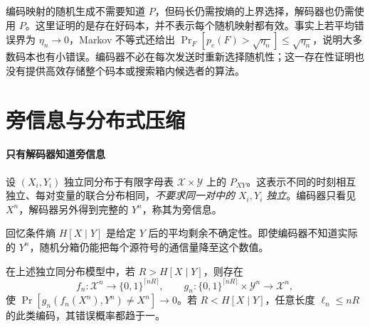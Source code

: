 \documentclass[lang=cn,a4paper,fontset=none,zihao=false,10pt,openany,twoside]{beautybook}
\numberwithin{algorithm}{chapter}
\begin{document}
编码映射的随机生成不需要知道 $P$，但码长仍需按熵的上界选择，解码器也仍需使用 $P$。这里证明的是存在好码本，并不表示每个随机映射都有效。事实上若平均错误界为 $\eta_n\to0$，Markov 不等式还给出 $\Pr_F[p_e(F)>\sqrt{\eta_n}]\le\sqrt{\eta_n}$，说明大多数码本也有小错误。编码器不必在每次发送时重新选择随机性；这一存在性证明也没有提供高效存储整个码本或搜索箱内候选者的算法。

\section{旁信息与分布式压缩}\label{sec:side-information}
\paragraph{只有解码器知道旁信息}
设 $(X_i,Y_i)$ 独立同分布于有限字母表 $\mathcal X\times\mathcal Y$ 上的 $P_{XY}$。这表示不同的时刻相互独立、每对变量的联合分布相同，\emph{不要求同一对中的 $X_i,Y_i$ 独立}。编码器只看见 $X^n$，解码器另外得到完整的 $Y^n$，称其为旁信息。
\begin{center}
\end{center}
回忆条件熵 $H[X\mid Y]$ 是给定 $Y$ 后的平均剩余不确定性。即使编码器不知道实际的 $Y^n$，随机分箱仍能把每个源符号的通信量降至这个数值。
\begin{theorem}[带解码端旁信息的压缩]\label{thm:side-information}
在上述独立同分布模型中，若 $R>H[X\mid Y]$，则存在
\[
 f_n:\mathcal X^n\to\{0,1\}^{\lceil nR\rceil},\qquad
 g_n:\{0,1\}^{\lceil nR\rceil}\times\mathcal Y^n\to\mathcal X^n,
\]
使 $\Pr[g_n(f_n(X^n),Y^n)\ne X^n]\to0$。若 $R<H[X\mid Y]$，任意长度 $\ell_n\le nR$ 的此类编码，其错误概率都趋于一。
\end{theorem}
\end{document}
